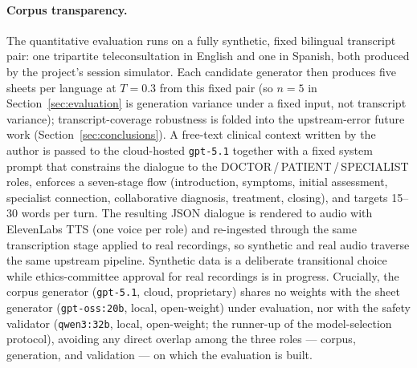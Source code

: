 
\paragraph{Corpus transparency.}
\label{par:corpus_transparency}
The quantitative evaluation runs on a fully synthetic, fixed bilingual transcript pair: one tripartite teleconsultation in English and one in Spanish, both produced by the project's session simulator.
Each candidate generator then produces five sheets per language at $T{=}0.3$ from this fixed pair (so $n{=}5$ in Section~\ref{sec:evaluation} is generation variance under a fixed input, not transcript variance); transcript-coverage robustness is folded into the upstream-error future work (Section~\ref{sec:conclusions}).
A free-text clinical context written by the author is passed to the cloud-hosted \texttt{gpt-5.1} together with a fixed system prompt that constrains the dialogue to the DOCTOR\,/\,PATIENT\,/\,SPECIALIST roles, enforces a seven-stage flow (introduction, symptoms, initial assessment, specialist connection, collaborative diagnosis, treatment, closing), and targets 15--30 words per turn.
The resulting JSON dialogue is rendered to audio with ElevenLabs TTS (one voice per role) and re-ingested through the same transcription stage applied to real recordings, so synthetic and real audio traverse the same upstream pipeline.
Synthetic data is a deliberate transitional choice while ethics-committee approval for real recordings is in progress.
Crucially, the corpus generator (\texttt{gpt-5.1}, cloud, proprietary) shares no weights with the sheet generator (\texttt{gpt-oss:20b}, local, open-weight) under evaluation, nor with the safety validator (\texttt{qwen3:32b}, local, open-weight; the runner-up of the model-selection protocol), avoiding any direct overlap among the three roles --- corpus, generation, and validation --- on which the evaluation is built.